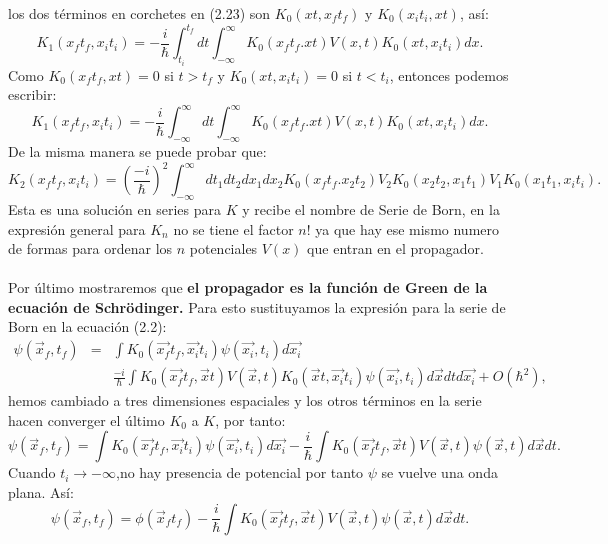 los dos términos en corchetes en (2.23) son $K_0(xt,x_ft_f)$ y $K_0(x_it_i,xt)$, así:
\begin{equation}
K_1(x_ft_f,x_it_i)= -\frac{i}{\hbar}\int_{t_{i}}^{t_{f}}dt\int_{-\infty}^{\infty}K_{0}(x_{f}t_{f}.xt)V(x,t)K_{0}(xt,x_{i}t_{i})dx .
\end{equation}
Como $K_0(x_ft_f,xt)=0$ si $t>t_f$ y $K_0(xt,x_it_i)=0$ si $t<t_i$, entonces podemos escribir:
\begin{equation}
K_1(x_ft_f,x_it_i)=-\frac{i}{\hbar}\int_{-\infty}^{\infty}dt\int_{-\infty}^{\infty}K_{0}(x_{f}t_{f}.xt)V(x,t)K_{0}(xt,x_{i}t_{i})dx .
\end{equation}
De la misma manera se puede probar que:
\begin{equation}
K_2(x_ft_f,x_it_i)=\left(\frac{-i}{\hbar}\right)^2\int_{-\infty}^{\infty}dt_{1}dt_{2}dx_{1}dx_{2}K_{0}(x_{f}t_{f}.x_{2}t_{2})V_2K_{0}(x_{2}t_{2},x_{1}t_{1})V_1K_{0}(x_{1}t_{1},x_{i}t_{i}).
\end{equation}
Esta es una solución en series para $K$ y recibe el nombre de Serie de Born, en la expresión general para $K_n$ no se tiene el factor $n!$ ya que hay ese mismo numero de formas para ordenar los $n$ potenciales $V(x)$ que entran en el propagador.
\\
\\
Por último mostraremos que \textbf{el propagador es la función de Green de la ecuación de Schrödinger.} Para esto sustituyamos la expresión para la serie de Born en la ecuación (2.2):
\begin{eqnarray}
\nonumber \psi(\vec{x}_f,t_f)&=&\int K_{0}(\vec{x_{f}}t_{f},\vec{x_{i}}t_{i})\psi(\vec{x_{i}},t_{i})d\vec{x_{i}}\\
& & \frac{-i}{\hbar}\int K_{0}(\vec{x_{f}}t_{f},\vec{x}t)V(\vec{x},t)K_{0}(\vec{x}t,\vec{x_{i}}t_{i})\psi(\vec{x_{i}},t_{i})d\vec{x}dtd\vec{x_{i}}+O(\hbar^{2}),
\end{eqnarray}
hemos cambiado a tres dimensiones espaciales y los otros términos en la serie hacen converger el último $K_0$ a $K$, por tanto:
\begin{equation}
\psi(\vec{x}_f,t_f)=\int K_{0}(\vec{x_{f}}t_{f},\vec{x_{i}}t_{i})\psi(\vec{x_{i}},t_{i})d\vec{x_{i}}-\frac{i}{\hbar}\int K_{0}(\vec{x_{f}}t_{f},\vec{x}t)V(\vec{x},t)\psi(\vec{x},t)d\vec{x}dt .
\end{equation}
Cuando $t_i \to -\infty$,no hay presencia de potencial por tanto $\psi$ se vuelve una onda plana. Así:
\begin{equation}
\psi(\vec{x}_f,t_f)=\phi(\vec{x}_ft_f)-\frac{i}{\hbar}\int K_{0}(\vec{x_{f}}t_{f},\vec{x}t)V(\vec{x},t)\psi(\vec{x},t)d\vec{x}dt.
\end{equation}
